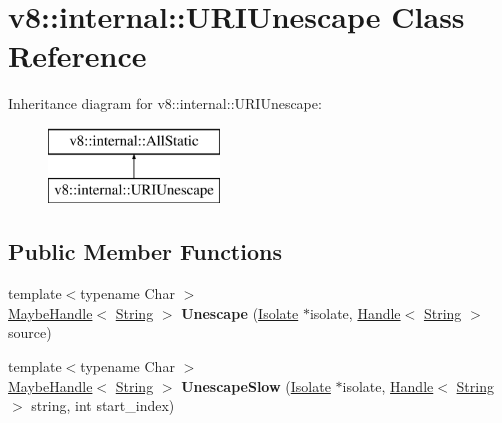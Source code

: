 \hypertarget{classv8_1_1internal_1_1_u_r_i_unescape}{}\section{v8\+:\+:internal\+:\+:U\+R\+I\+Unescape Class Reference}
\label{classv8_1_1internal_1_1_u_r_i_unescape}
Inheritance diagram for v8\+:\+:internal\+:\+:U\+R\+I\+Unescape\+:\begin{figure}[H]
\begin{center}
\leavevmode
\includegraphics[height=2.000000cm]{classv8_1_1internal_1_1_u_r_i_unescape}
\end{center}
\end{figure}
\subsection*{Public Member Functions}
\begin{DoxyCompactItemize}
\item 
\hypertarget{classv8_1_1internal_1_1_u_r_i_unescape_a45c6c6f632e00cbfe3cb0cb1669acc0d}{}{\footnotesize template$<$typename Char $>$ }\\\hyperlink{classv8_1_1internal_1_1_maybe_handle}{Maybe\+Handle}$<$ \hyperlink{classv8_1_1internal_1_1_string}{String} $>$ {\bfseries Unescape} (\hyperlink{classv8_1_1internal_1_1_isolate}{Isolate} $\ast$isolate, \hyperlink{classv8_1_1internal_1_1_handle}{Handle}$<$ \hyperlink{classv8_1_1internal_1_1_string}{String} $>$ source)\label{classv8_1_1internal_1_1_u_r_i_unescape_a45c6c6f632e00cbfe3cb0cb1669acc0d}

\item 
\hypertarget{classv8_1_1internal_1_1_u_r_i_unescape_a5a9dc1bfade32efa347b4c998fb3b07d}{}{\footnotesize template$<$typename Char $>$ }\\\hyperlink{classv8_1_1internal_1_1_maybe_handle}{Maybe\+Handle}$<$ \hyperlink{classv8_1_1internal_1_1_string}{String} $>$ {\bfseries Unescape\+Slow} (\hyperlink{classv8_1_1internal_1_1_isolate}{Isolate} $\ast$isolate, \hyperlink{classv8_1_1internal_1_1_handle}{Handle}$<$ \hyperlink{classv8_1_1internal_1_1_string}{String} $>$ string, int start\+\_\+index)\label{classv8_1_1internal_1_1_u_r_i_unescape_a5a9dc1bfade32efa347b4c998fb3b07d}

\end{DoxyCompactItemize}
